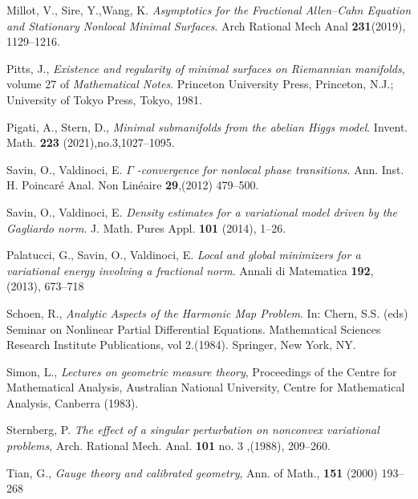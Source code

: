 \begin{thebibliography}{9}
Millot, V., Sire, Y.,Wang, K. \textit{Asymptotics for the Fractional Allen–Cahn Equation and Stationary Nonlocal Minimal Surfaces}. Arch Rational Mech Anal \textbf{231}(2019), 1129–1216.

Pitts, J.,\textit{ Existence and regularity of minimal surfaces on Riemannian manifolds}, volume 27 of \textit{Mathematical
Notes}. Princeton University Press, Princeton, N.J.; University of Tokyo Press, Tokyo, 1981.

Pigati, A., Stern, D., \textit{Minimal submanifolds from the abelian Higgs model}. Invent. Math. \textbf{223} (2021),no.3,1027–1095.

Savin, O., Valdinoci, E. \textit{$\Gamma$ 
-convergence for nonlocal phase transitions}. Ann. Inst. H. Poincaré Anal. Non Linéaire \textbf{29},(2012) 479–500.

Savin, O., Valdinoci, E. \textit{Density estimates for a variational model driven by the Gagliardo
norm}. J. Math. Pures Appl. \textbf{101} (2014), 1–26.

Palatucci, G., Savin, O., Valdinoci, E. \textit{Local and global minimizers for a variational energy involving a fractional norm}. Annali di Matematica \textbf{192}, (2013), 673–718

Schoen, R., \textit{Analytic Aspects of the Harmonic Map Problem}. In: Chern, S.S. (eds) Seminar on Nonlinear Partial Differential Equations. Mathematical Sciences Research Institute Publications, vol 2.(1984). Springer, New York, NY.

Simon, L., \textit{Lectures on geometric measure theory}, Proceedings of the Centre for Mathematical Analysis, Australian National University, Centre for Mathematical Analysis, Canberra (1983).

Sternberg, P. \textit{The effect of a singular perturbation on nonconvex variational problems}, Arch. Rational Mech. Anal. \textbf{101} no. 3 ,(1988), 209–260.

Tian, G., \textit{Gauge theory and calibrated geometry}, Ann. of Math., \textbf{151} (2000) 193–268


\end{thebibliography}
